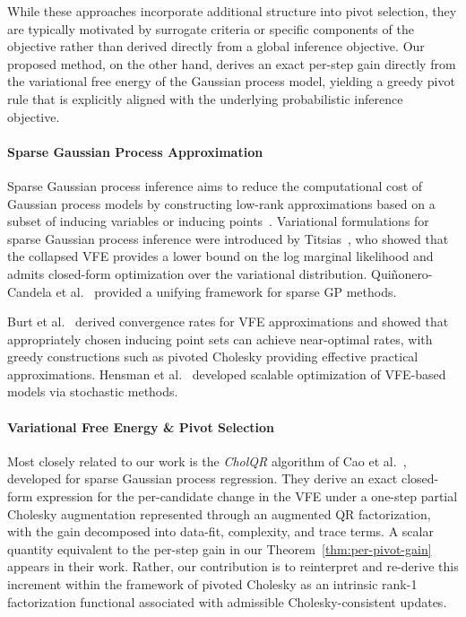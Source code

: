 \documentclass[onefignum,onetabnum]{siamart250211}
\begin{document}
While these approaches incorporate additional structure into pivot selection, they are typically motivated by surrogate criteria or specific components of the objective rather than derived directly from a global inference objective. Our proposed method, on the other hand, derives an exact per-step gain directly from the variational free energy of the Gaussian process model, yielding a greedy pivot rule that is explicitly aligned with the underlying probabilistic inference objective.

\paragraph{Sparse Gaussian Process Approximation}
\sloppy
Sparse Gaussian process inference aims to reduce the computational cost of Gaussian process models by constructing low-rank approximations based on a subset of inducing variables or inducing points~\cite{liu.2020}. Variational formulations for sparse Gaussian process inference were introduced by Titsias~\cite{Titsias.2009}, who showed that the collapsed VFE provides a lower bound on the log marginal likelihood and admits closed-form optimization over the variational distribution. Qui\~{n}onero-Candela et al.~\cite{quionero.2005} provided a unifying framework for sparse GP methods. 

Burt et al.~\cite{burt.2020} derived convergence rates for VFE approximations and showed that appropriately chosen inducing point sets can achieve near-optimal rates, with greedy constructions such as pivoted Cholesky providing effective practical approximations. Hensman et al.~\cite{hensman.2013} developed scalable optimization of VFE-based models via stochastic methods.

\paragraph{Variational Free Energy \& Pivot Selection}
Most closely related to our work is the \textit{CholQR} algorithm of Cao et al.~\cite{cao.2015}, developed for sparse Gaussian process regression. They derive an exact closed-form expression for the per-candidate change in the VFE under a one-step partial Cholesky augmentation represented through an augmented QR factorization, with the gain decomposed into data-fit, complexity, and trace terms. A scalar quantity equivalent to the per-step gain in our Theorem~\ref{thm:per-pivot-gain} appears in their work. Rather, our contribution is to reinterpret and re-derive this increment within the framework of pivoted Cholesky as an intrinsic rank-1 factorization functional associated with admissible Cholesky-consistent updates.
\end{document}
